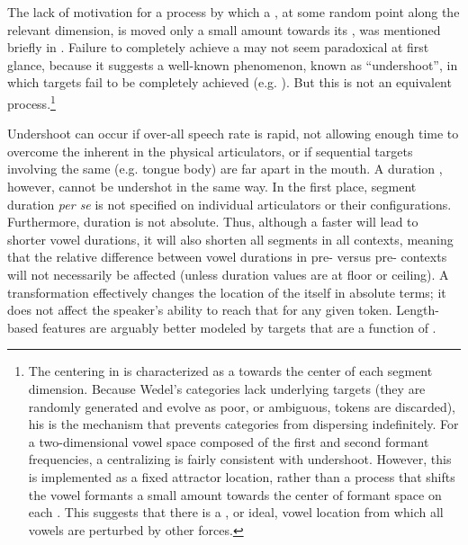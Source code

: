 The lack of motivation for a process by which a , at some
random point along the relevant dimension, is moved only a small amount
towards its , was mentioned briefly in .
Failure to completely achieve a  may not seem paradoxical at
first glance, because it suggests a well-known  phenomenon,
known as “undershoot”, in which targets fail to be completely
achieved (e.g. \citealt{Lindblom1963}). But this is not an equivalent
process.\footnote{The centering  in \citet{Wedel2008} is characterized as a 
 towards the center of each segment dimension. Because Wedel's
categories lack underlying targets (they are randomly generated and
evolve as poor, or ambiguous, tokens are discarded), his 
 is the mechanism that prevents categories from dispersing indefinitely.
For a two-dimensional  vowel space composed of the first and
second formant frequencies, a centralizing  is fairly consistent
with undershoot. However, this  is implemented as a fixed attractor
location, rather than a process that shifts the vowel formants a small
amount towards the center of formant space on each . This
suggests that there is a , or ideal, vowel location from which
all vowels are perturbed by other forces. }

Undershoot can occur if over-all speech rate is rapid, not allowing
enough time to overcome the  inherent in the physical articulators,
or if sequential targets involving the same  (e.g. tongue
body) are far apart in the mouth. A duration , however, cannot
be undershot in the same way. In the first place, segment duration
\emph{per se} is not specified on individual articulators or their
configurations. Furthermore, duration is not absolute. Thus, although
a faster  will lead to shorter vowel durations, it will
also shorten all segments in all contexts, meaning that the relative
difference between vowel durations in pre- versus pre-
contexts will not necessarily be affected (unless duration values
are at floor or ceiling). A  transformation effectively
changes the location of the  itself in absolute terms; it does
not affect the speaker's ability to reach that  for any given
token. Length-based features are arguably better modeled by targets
that are a function of . 

